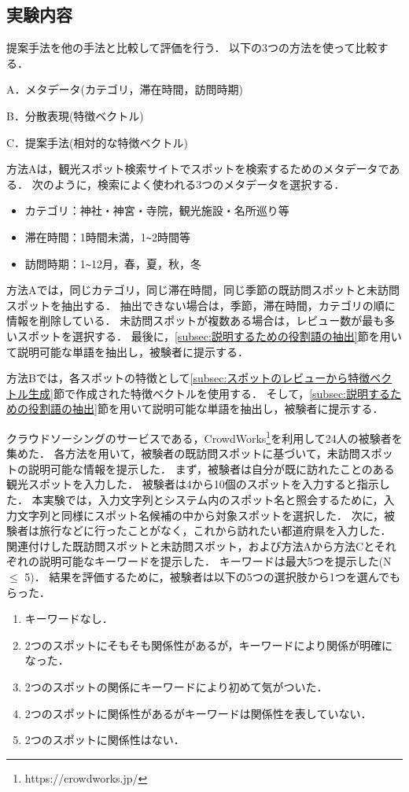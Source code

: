 \documentclass{deimj}
\begin{document}
\subsection{実験内容}
提案手法を他の手法と比較して評価を行う．
以下の3つの方法を使って比較する．
\begin{description}
  \item A．メタデータ(カテゴリ，滞在時間，訪問時期)
  \item B．分散表現(特徴ベクトル)
  \item C．提案手法(相対的な特徴ベクトル)
\end{description}

方法Aは，観光スポット検索サイトでスポットを検索するためのメタデータである．
次のように，検索によく使われる3つのメタデータを選択する．
\begin{itemize}
 \item カテゴリ：神社・神宮・寺院，観光施設・名所巡り等
 \item 滞在時間：1時間未満，1\verb|~|2時間等
 \item 訪問時期：1\verb|~|12月，春，夏，秋，冬
\end{itemize}

方法Aでは，同じカテゴリ，同じ滞在時間，同じ季節の既訪問スポットと未訪問スポットを抽出する．
抽出できない場合は，季節，滞在時間，カテゴリの順に情報を削除している．
未訪問スポットが複数ある場合は，レビュー数が最も多いスポットを選択する．
最後に，\ref{subsec:説明するための役割語の抽出}節を用いて説明可能な単語を抽出し，被験者に提示する．

方法Bでは，各スポットの特徴として\ref{subsec:スポットのレビューから特徴ベクトル生成}節で作成された特徴ベクトルを使用する．
そして，\ref{subsec:説明するための役割語の抽出}節を用いて説明可能な単語を抽出し，被験者に提示する．

クラウドソーシングのサービスである，CrowdWorks\footnote{https://crowdworks.jp/}を利用して24人の被験者を集めた．
各方法を用いて，被験者の既訪問スポットに基づいて，未訪問スポットの説明可能な情報を提示した．
まず，被験者は自分が既に訪れたことのある観光スポットを入力した．
被験者は4から10個のスポットを入力すると指示した．
本実験では，入力文字列とシステム内のスポット名と照会するために，入力文字列と同様にスポット名候補の中から対象スポットを選択した．
次に，被験者は旅行などに行ったことがなく，これから訪れたい都道府県を入力した．
関連付けした既訪問スポットと未訪問スポット，および方法Aから方法Cとそれぞれの説明可能なキーワードを提示した．
キーワードは最大5つを提示した(N $\le$ 5)．
結果を評価するために，被験者は以下の5つの選択肢から1つを選んでもらった．
\begin{enumerate}
  \item キーワードなし．
  \item 2つのスポットにそもそも関係性があるが，キーワードにより関係が明確になった．
  \item 2つのスポットの関係にキーワードにより初めて気がついた．
  \item 2つのスポットに関係性があるがキーワードは関係性を表していない．
  \item 2つのスポットに関係性はない．
\end{enumerate}
\end{document}
